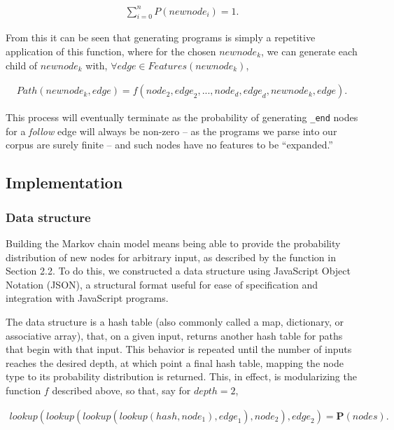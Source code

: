 \documentclass{article}
\begin{document}
\begin{align*}
\sum\limits_{i = 0}^n P({newnode_i}) = 1.
\end{align*}

From this it can be seen that generating programs is simply a repetitive application of this function, where for the chosen ${newnode}_k$, we can generate each child of ${newnode}_k$ with, $\forall {edge} \in {Features}({newnode}_k)$,

\begin{align*}
{Path}({newnode}_k, {edge}) = f({node}_2, {edge}_2, ..., {node}_{d}, {edge}_{d}, {newnode}_k, {edge}).
\end{align*}

This process will eventually terminate as the probability of generating {\tt \_end} nodes for a \emph{follow} edge will always be non-zero -- as the programs we parse into our corpus are surely finite -- and such nodes have no features to be ``expanded.''

\subsection{Implementation}

\subsubsection{Data structure}

Building the Markov chain model means being able to provide the probability distribution of new nodes for arbitrary input,
as described by the function in Section 2.2. To do this, we constructed a data structure using JavaScript Object Notation (JSON),
a structural format useful for ease of specification and integration with JavaScript programs.

The data structure is a hash table (also commonly called a map, dictionary, or associative array), that, on a given input, returns another hash table for paths that begin with that input. This behavior is repeated until the number of inputs reaches the desired depth, at which point a final hash table, mapping the node type to its probability distribution is returned. This, in effect, is modularizing the function $f$ described above, so that, say for ${depth} = 2$,

\begin{align*}
lookup(lookup(lookup(lookup({hash}, {node}_1), {edge}_1), {node}_2), {edge}_2) = \textbf{P}({nodes}).
\end{align*}
\end{document}

